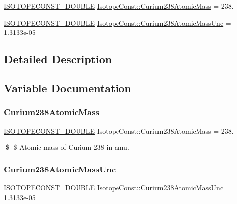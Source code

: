 \begin{DoxyCompactItemize}
\item 
\mbox{\hyperlink{group___isotope_const-_macros_ga8f45a7272ce02c0b4c65c44636ed719a}{I\+S\+O\+T\+O\+P\+E\+C\+O\+N\+S\+T\+\_\+\+D\+O\+U\+B\+LE}} \mbox{\hyperlink{group___isotope_const-_curium-_cm238_gadafa69e33ee0e9fdae49a46a8f0214e6}{Isotope\+Const\+::\+Curium238\+Atomic\+Mass}} = 238.
\item 
\mbox{\hyperlink{group___isotope_const-_macros_ga8f45a7272ce02c0b4c65c44636ed719a}{I\+S\+O\+T\+O\+P\+E\+C\+O\+N\+S\+T\+\_\+\+D\+O\+U\+B\+LE}} \mbox{\hyperlink{group___isotope_const-_curium-_cm238_ga2b3dbad8b87406edad862f54719f2f82}{Isotope\+Const\+::\+Curium238\+Atomic\+Mass\+Unc}} = 1.\+3133e-\/05
\end{DoxyCompactItemize}


\subsection{Detailed Description}


\subsection{Variable Documentation}
\mbox{\label{group___isotope_const-_curium-_cm238_gadafa69e33ee0e9fdae49a46a8f0214e6}} 
\subsubsection{\texorpdfstring{Curium238\+Atomic\+Mass}{Curium238AtomicMass}}
{\footnotesize\ttfamily \mbox{\hyperlink{group___isotope_const-_macros_ga8f45a7272ce02c0b4c65c44636ed719a}{I\+S\+O\+T\+O\+P\+E\+C\+O\+N\+S\+T\+\_\+\+D\+O\+U\+B\+LE}} Isotope\+Const\+::\+Curium238\+Atomic\+Mass = 238.}

\$ \$ Atomic mass of Curium-\/238 in amu. \mbox{\label{group___isotope_const-_curium-_cm238_ga2b3dbad8b87406edad862f54719f2f82}} 
\subsubsection{\texorpdfstring{Curium238\+Atomic\+Mass\+Unc}{Curium238AtomicMassUnc}}
{\footnotesize\ttfamily \mbox{\hyperlink{group___isotope_const-_macros_ga8f45a7272ce02c0b4c65c44636ed719a}{I\+S\+O\+T\+O\+P\+E\+C\+O\+N\+S\+T\+\_\+\+D\+O\+U\+B\+LE}} Isotope\+Const\+::\+Curium238\+Atomic\+Mass\+Unc = 1.\+3133e-\/05}

